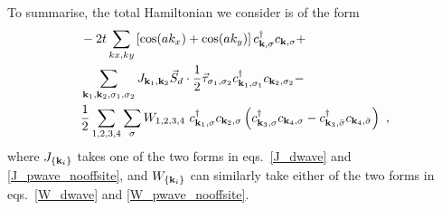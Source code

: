 \documentclass[reprint,hidelinks]{revtex4-2}
\begin{document}
To summarise, the total Hamiltonian we consider is of the form
\begin{equation}\begin{aligned}\label{hamiltonian}
	&-2t\sum_{kx,k y}\left[\cos(ak_x) + \cos(ak_y)\right] c^\dagger_{{\bf k},\sigma}c_{{\bf k},\sigma} + \\
	 &\sum_{{\bf k}_1, {\bf k}_2, \sigma_1, \sigma_2} J_{{\bf k}_1, {\bf k}_2} \vec{S}_d\cdot\frac{1}{2}\vec{\tau}_{\sigma_1,\sigma_2} c^\dagger_{{\bf k}_1,\sigma_1}c_{{\bf k}_2,\sigma_2} -\\
	 &\frac{1}{2}\sum_{1, 2, 3, 4}\sum_\sigma W_{1,2,3,4}~ c^\dagger_{{\bf k}_1,\sigma}c_{{\bf k}_2,\sigma}\left(c^\dagger_{{\bf k}_3,\sigma}c_{{\bf k}_4,\sigma} - c^\dagger_{{\bf k}_3,\bar\sigma}c_{{\bf k}_4,\bar\sigma}\right)~,
\end{aligned}\end{equation}
where \(J_{\left\{ {\bf k}_i \right\} }\) takes one of the two forms in eqs.~\ref{J_dwave} and \ref{J_pwave_nooffsite}, and \(W_{\left\{{\bf k}_i\right\}}\) can similarly take either of the two forms in eqs.~\ref{W_dwave} and \ref{W_pwave_nooffsite}. 
\end{document}
